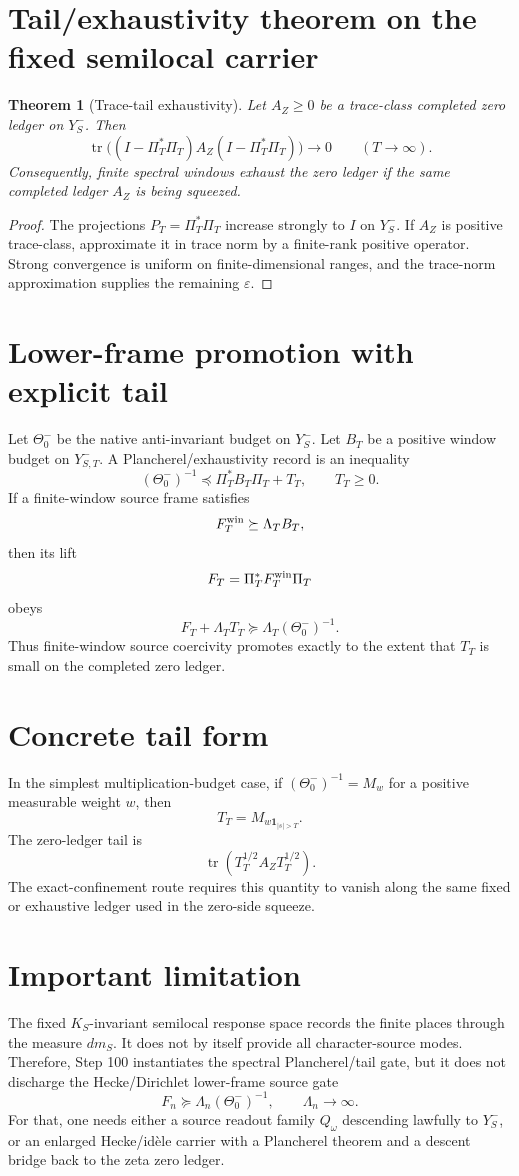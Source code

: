 \documentclass[11pt]{article}
\newtheorem{theorem}{Theorem}
\newcommand{\one}{\mathbf 1}
\begin{document}
\section{Tail/exhaustivity theorem on the fixed semilocal carrier}
\begin{theorem}[Trace-tail exhaustivity]
Let $A_Z\ge0$ be a trace-class completed zero ledger on $Y_S^-$. Then
\[
 \operatorname{tr}\big((I-\Pi_T^*\Pi_T)A_Z(I-\Pi_T^*\Pi_T)\big)\to0
 \qquad (T\to\infty).
\]
Consequently, finite spectral windows exhaust the zero ledger if the same completed ledger $A_Z$ is being squeezed.
\end{theorem}
\begin{proof}
The projections $P_T=\Pi_T^*\Pi_T$ increase strongly to $I$ on $Y_S^-$.  If $A_Z$ is positive trace-class, approximate it in trace norm by a finite-rank positive operator.  Strong convergence is uniform on finite-dimensional ranges, and the trace-norm approximation supplies the remaining $\varepsilon$.
\end{proof}

\section{Lower-frame promotion with explicit tail}
Let $\Theta_0^-$ be the native anti-invariant budget on $Y_S^-$.  Let $B_T$ be a positive window budget on $Y_{S,T}^-$.  A Plancherel/exhaustivity record is an inequality
\[
  (\Theta_0^-)^{-1}\preceq \Pi_T^*B_T\Pi_T+T_T,
  \qquad T_T\ge0.
\]
If a finite-window source frame satisfies
\[
  F_T^{\rm win}\succeq \Lambda_T B_T,
\]
then its lift
\[
  F_T=\Pi_T^*F_T^{\rm win}\Pi_T
\]
obeys
\[
  F_T+\Lambda_TT_T\succeq \Lambda_T(\Theta_0^-)^{-1}.
\]
Thus finite-window source coercivity promotes exactly to the extent that $T_T$ is small on the completed zero ledger.

\section{Concrete tail form}
In the simplest multiplication-budget case, if $(\Theta_0^-)^{-1}=M_w$ for a positive measurable weight $w$, then
\[
  T_T=M_{w\one_{|s|>T}}.
\]
The zero-ledger tail is
\[
  \operatorname{tr}(T_T^{1/2}A_ZT_T^{1/2}).
\]
The exact-confinement route requires this quantity to vanish along the same fixed or exhaustive ledger used in the zero-side squeeze.

\section{Important limitation}
The fixed $K_S$-invariant semilocal response space records the finite places through the measure $dm_S$.  It does not by itself provide all character-source modes.  Therefore, Step 100 instantiates the spectral Plancherel/tail gate, but it does not discharge the Hecke/Dirichlet lower-frame source gate
\[
  F_n\succeq \Lambda_n(\Theta_0^-)^{-1},\qquad \Lambda_n\to\infty.
\]
For that, one needs either a source readout family $Q_\omega$ descending lawfully to $Y_S^-$, or an enlarged Hecke/id\`ele carrier with a Plancherel theorem and a descent bridge back to the zeta zero ledger.
\end{document}
